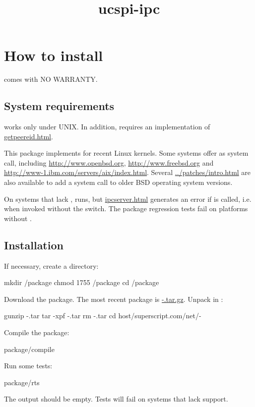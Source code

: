 \documentclass{book}
\title{ucspi-ipc}
\begin{document}
\section{How to install \package}

\package{} comes with NO WARRANTY.

\subsection{System requirements}
\package{} works only under UNIX.  In addition, \package{} requires
an implementation of \href{\cmd{getpeereid}}{getpeereid.html}.

This package implements  for recent Linux kernels.
Some systems offer  as system call, including
\href{OpenBSD~3.0}{http://www.openbsd.org},
\href{FreeBSD~4.6}{http://www.freebsd.org} and
\href{AIX~5L}{http://www-1.ibm.com/servers/aix/index.html}.
Several \href{patches}{../patches/intro.html} are also available to add
a  system call to older BSD operating system versions.

On systems that lack , \package{} runs, but
\href{\cmd{ipcserver}}{ipcserver.html} generates an error if 
is called, i.e. when invoked without the  switch.  The package
regression tests fail on platforms without .

\subsection{Installation}
If necessary, create a  directory:
\begin{code}%
  mkdir /package
  chmod 1755 /package
  cd /package
\end{code}

Download the \package{} package.  The most recent \package{} package is
\href{\package~\version}{\package-\version.tar.gz}.  Unpack \package{} in
:
\begin{code}%
  gunzip \package-\version.tar
  tar -xpf \package-\version.tar
  rm \package-\version.tar
  cd host/superscript.com/net/\package-\version
\end{code}

Compile the package:
\begin{code}%
  package/compile
\end{code}

Run some tests:
\begin{code}%
  package/rts
\end{code}
The output should be empty.  Tests will fail on systems that lack
 support.
\end{document}
